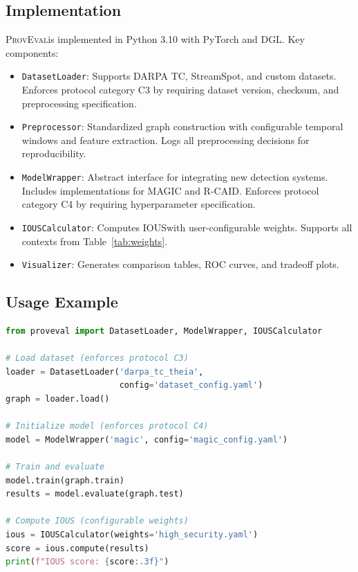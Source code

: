 \documentclass[11pt,a4paper]{article}
\newcommand{\ious}{\textsc{IOUS}}
\newcommand{\proveval}{\textsc{ProvEval}}
\begin{document}
\subsection{Implementation}

\proveval is implemented in Python 3.10 with PyTorch and DGL. Key components:

\begin{itemize}[leftmargin=*]
    \item \texttt{DatasetLoader}: Supports DARPA TC, StreamSpot, and custom datasets. Enforces protocol category C3 by requiring dataset version, checksum, and preprocessing specification.
    \item \texttt{Preprocessor}: Standardized graph construction with configurable temporal windows and feature extraction. Logs all preprocessing decisions for reproducibility.
    \item \texttt{ModelWrapper}: Abstract interface for integrating new detection systems. Includes implementations for MAGIC and R-CAID. Enforces protocol category C4 by requiring hyperparameter specification.
    \item \texttt{IOUSCalculator}: Computes \ious with user-configurable weights. Supports all contexts from Table~\ref{tab:weights}.
    \item \texttt{Visualizer}: Generates comparison tables, ROC curves, and tradeoff plots.
\end{itemize}

\subsection{Usage Example}

\begin{lstlisting}[language=Python, basicstyle=\ttfamily\small, frame=single]
from proveval import DatasetLoader, ModelWrapper, IOUSCalculator

# Load dataset (enforces protocol C3)
loader = DatasetLoader('darpa_tc_theia', 
                       config='dataset_config.yaml')
graph = loader.load()

# Initialize model (enforces protocol C4)
model = ModelWrapper('magic', config='magic_config.yaml')

# Train and evaluate
model.train(graph.train)
results = model.evaluate(graph.test)

# Compute IOUS (configurable weights)
ious = IOUSCalculator(weights='high_security.yaml')
score = ious.compute(results)
print(f"IOUS score: {score:.3f}")
\end{lstlisting}
\end{document}
